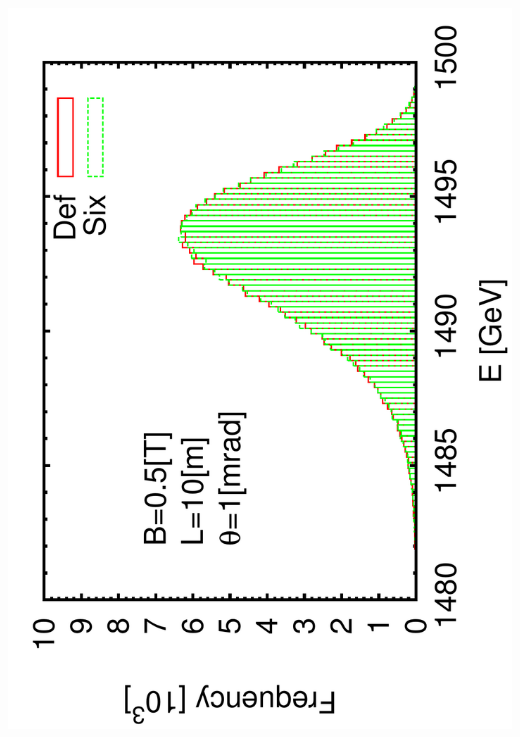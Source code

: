 \documentclass{beamer}
\begin{document}
\begin{frame}
 \includegraphics[scale=0.24,angle=-90]{histogram1e-3.pdf}\par

\end{frame}
\end{document}
